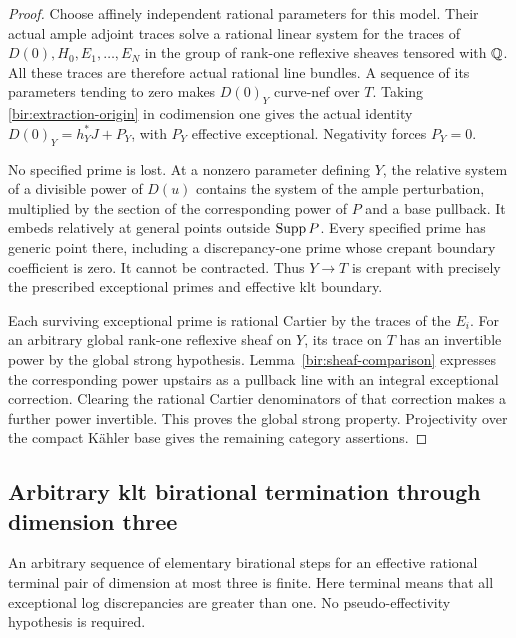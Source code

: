 \begin{proof}
Choose affinely independent rational parameters for this model.
Their actual ample adjoint traces solve a rational linear system for
the traces of $D(0),H_0,E_1,\ldots,E_N$ in the group of rank-one
reflexive sheaves tensored with $\mathbb{Q}$.  All these traces are therefore
actual rational line bundles.  A sequence of its parameters tending
to zero makes $D(0)_Y$ curve-nef over $T$.  Taking
\eqref{bir:extraction-origin} in codimension one gives the actual
identity $D(0)_Y=h_Y^*J+P_Y$, with $P_Y$ effective exceptional.
Negativity forces $P_Y=0$.

No specified prime is lost.  At a nonzero parameter defining $Y$,
the relative system of a divisible power of $D(u)$ contains the
system of the ample perturbation, multiplied by the section of the
corresponding power of $P$ and a base pullback.  It embeds relatively
at general points outside $\operatorname{Supp} P$.  Every specified prime has
generic point there, including a discrepancy-one prime whose
crepant boundary coefficient is zero.  It cannot be contracted.
Thus $Y\to T$ is crepant with precisely the prescribed exceptional
primes and effective klt boundary.

Each surviving exceptional prime is rational Cartier by the traces
of the $E_i$.  For an arbitrary global rank-one reflexive sheaf on
$Y$, its trace on $T$ has an invertible power by the global strong
hypothesis.  Lemma~\ref{bir:sheaf-comparison} expresses the
corresponding power upstairs as a pullback line with an integral
exceptional correction.  Clearing the rational Cartier denominators
of that correction makes a further power invertible.  This proves
the global strong property.  Projectivity over the compact K\"ahler
base gives the remaining category assertions.
\end{proof}

\subsection{Arbitrary klt birational termination through dimension three}
\label{bir:threefolds}

\begin{proposition}
\label{bir:terminal-termination}
An arbitrary sequence of elementary birational steps for an effective
rational terminal pair of dimension at most three is finite.  Here
terminal means that all exceptional log discrepancies are greater
than one.  No pseudo-effectivity hypothesis is required.
\end{proposition}

